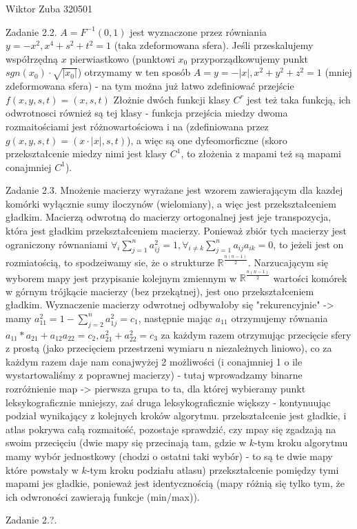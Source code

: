 \documentclass{article}
\begin{document}
Wiktor Zuba 320501
\newline

Zadanie 2.2.
\newline
\newline
$A=F^{-1}(0,1)$ jest wyznaczone przez równiania $y=-x^2,x^4+s^2+t^2=1$ (taka zdeformowana sfera).
Jeśli przeskalujemy współrzędną $x$ pierwiastkowo (punktowi $x_0$ przyporządkowujemy punkt $sgn(x_0)\cdot\sqrt{|x_0|}$)
otrzymamy w ten sposób $A={y=-|x|,x^2+y^2+z^2=1}$ (mniej zdeformowana sfera) - na tym można już łatwo zdefiniować przejście $f(x,y,s,t)=(x,s,t)$
Złożnie dwóch funkcji klasy $C^{r}$ jest też taka funkcją, ich odwrotnosci również są tej klasy - funkcja przejścia miedzy dwoma rozmaitościami
jest różnowartościowa i na (zdefiniowana przez $g(x,y,s,t)=(x\cdot|x|,s,t)$), a więc są one dyfeomorficzne
(skoro przekształcenie miedzy nimi jest klasy $C^1$, to złożenia z mapami też są mapami conajmniej $C^1$).
\newline

Zadanie 2.3.
\newline
\newline
Mnożenie macierzy wyrażane jest wzorem zawierającym dla kazdej komórki wyłącznie sumy iloczynów (wielomiany), a więc jest przekształceniem gładkim.\newline
Macierzą odwrotną do macierzy ortogonalnej jest jeje transpozycja, która jest gładkim przekształceniem macierzy.\newline
Ponieważ zbiór tych macierzy jest ograniczony równaniami $\forall_i \sum\limits_{j=1}^{n}a_{ij}^2=1,\forall_{i\neq k}\sum\limits_{j=1}^{n}a_{ij}a_{ik}=0$,
to jeżeli jest on rozmiatością, to spodzeiwamy sie, że o strukturze $\mathbb{R}^{\frac{n(n-1)}{2}}$.
Narzucającym się wyborem mapy jest przypisanie kolejnym zmiennym w $\mathbb{R}^{\frac{n(n-1)}{2}}$ wartości komórek w górnym trójkącie macierzy (bez przekątnej),
jest ono przekształceniem gładkim. Wyznaczenie macierzy odwrotnej odbywałoby się "rekurencyjnie" -> mamy $a_{11}^2=1-\sum\limits_{j=2}^{n}a_{1j}^2=c_1$,
następnie mając $a_11$ otrzymujemy równania $a_{11}*a_{21}+a_{12}a_{22}=c_2,a_{21}^2+a_{22}^2=c_3$ za każdym razem otrzymując przecięcie sfery z prostą
(jako przecięciem przestrzeni wymiaru n niezależnych liniowo), co za każdym razem daje nam conajwyżej 2 możliwości
(i conajmniej 1 o ile wystartowaliśmy z poprawnej macierzy) - tutaj wprowadzamy binarne rozróżnienie map -> pierwsza grupa to ta,
dla której wybieramy punkt leksykograficznie mniejszy, zaś druga leksykograficznie większy - kontynuując podział wynikający z kolejnych kroków algorytmu.\newline
przekształcenie jest gładkie, i atlas pokrywa całą rozmaitość, pozostaje sprawdzić, czy mpay się zgadzają na swoim przecięciu
(dwie mapy się przecinają tam, gdzie w $k$-tym kroku algorytmu mamy wybór jednostkowy (chodzi o ostatni taki wybór)
- to są te dwie mapy które powstały w $k$-tym kroku podziału atlasu)
przekształcenie pomiędzy tymi mapami jes gładkie, ponieważ jest identycznością (mapy różnią się tylko tym, że ich odwroności zawierają funkcje (min/max)).
\newline

Zadanie 2.?.
\newline
\newline
\end{document}
